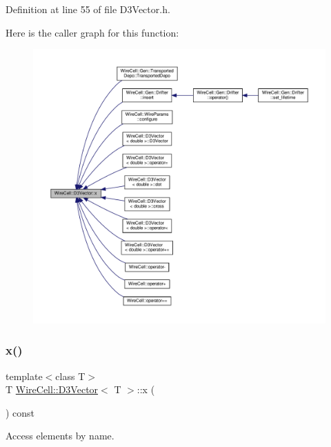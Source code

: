 Definition at line 55 of file D3\+Vector.\+h.

Here is the caller graph for this function\+:
\nopagebreak
\begin{figure}[H]
\begin{center}
\leavevmode
\includegraphics[width=350pt]{class_wire_cell_1_1_d3_vector_a9897c0952e82c2e7c285a4f064c00c80_icgraph}
\end{center}
\end{figure}
\mbox{\label{class_wire_cell_1_1_d3_vector_a65c5efb75f44d8bb1b7979151f442c09}} 
\subsubsection{\texorpdfstring{x()}{x()}\hspace{0.1cm}{\footnotesize\ttfamily [2/2]}}
{\footnotesize\ttfamily template$<$class T$>$ \\
T \hyperlink{class_wire_cell_1_1_d3_vector}{Wire\+Cell\+::\+D3\+Vector}$<$ T $>$\+::x (\begin{DoxyParamCaption}{ }\end{DoxyParamCaption}) const\hspace{0.3cm}{\ttfamily [inline]}}



Access elements by name. 



